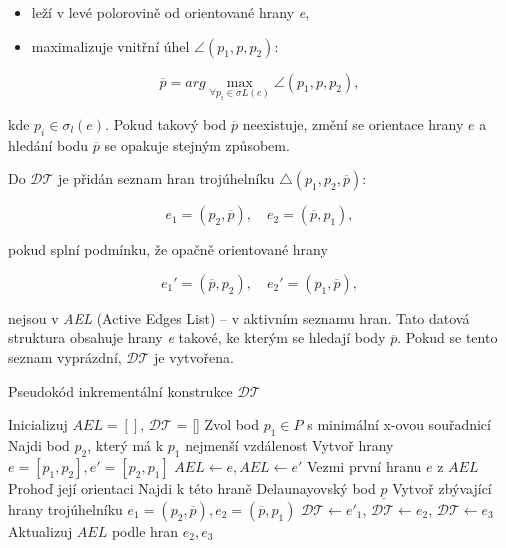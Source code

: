 \begin{itemize}
    \item leží v levé polorovině od orientované hrany \emph{e},
    \item maximalizuje vnitřní úhel $\angle (p_1,p,p_2)$:
\end{itemize}

\begin{equation*}
\overline{p} = arg\underset{\forall p_i \in \sigma L (e)}{\max}\angle (p_1,p,p_2),
\end{equation*}

\par kde $p_i \in \sigma_l (e)$. Pokud takový bod $\overline{p}$ neexistuje, změní se orientace hrany $e$ a hledání bodu $\overline{p}$ se opakuje stejným způsobem.
\par Do $\mathcal{DT}$ je přidán seznam hran trojúhelníku $\triangle (p_1, p_2, \overline{p})$:

\begin{equation*}
e_1 = (p_2, \overline{p}), \quad e_2 = (\overline{p}, p_1),
\end{equation*}

\par pokud splní podmínku, že opačně orientované hrany

\begin{equation*}
e_1' = (\overline{p}, p_2), \quad e_2' = (p_1, \overline{p}),
\end{equation*}

\par nejsou v \emph{AEL} (Active Edges List) – v aktivním seznamu hran. Tato datová struktura obsahuje hrany \emph{e} takové, ke kterým se hledají body $\overline{p}$. Pokud se tento seznam vyprázdní, $\mathcal{DT}$ je vytvořena.
\bigbreak
\begin{algorithm}[H]
\caption{Pseudokód inkrementální konstrukce $\mathcal{DT}$}\label{alg:cap}
\begin{algorithmic}
\State Inicializuj $AEL = []$, $\mathcal{DT}$ = []
\State Zvol bod $p_1 \in P$ s minimální x-ovou souřadnicí
\State Najdi bod $p_2$, který má k $p_1$ nejmenší vzdálenost
\State Vytvoř hrany $e = [p_1, p_2], e' = [p_2, p_1]$
\State $AEL \gets e, AEL \gets e'$
  \State Vezmi první hranu $e$ z $AEL$
  \State Prohoď její orientaci
  \State Najdi k této hraně Delaunayovský bod $\underline{p}$
      \State Vytvoř zbývající hrany trojúhelníku $e_1 = (p_2, \overline{p}), e_2 = (\overline{p}, p_1)$
      \State $\mathcal{DT} \gets e'_1$, $\mathcal{DT} \gets e_2$, $\mathcal{DT} \gets e_3$
      \State Aktualizuj $AEL$ podle hran $e_2, e_3$
    \EndIf
\EndWhile
{}
\end{algorithmic}
\end{algorithm}
\newpage

